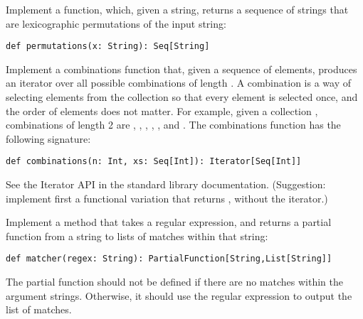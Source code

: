 \documentclass[11pt]{article}
\begin{document}

\begin{myExercise}
Implement a  function, which, given a string, returns a sequence of strings that are lexicographic permutations of the input string:
\begin{lstlisting}
def permutations(x: String): Seq[String]
\end{lstlisting}
\end{myExercise}

\begin{myExercise}
Implement a combinations function that, given a sequence of elements, produces an iterator over all possible combinations of length . A combination is a way of selecting elements from the collection so that every element is selected once, and the order of elements does not matter. For example, given a collection , combinations of length 2 are , , , , , and . The combinations function has the following signature:
\begin{lstlisting}
def combinations(n: Int, xs: Seq[Int]): Iterator[Seq[Int]]
\end{lstlisting}
See the Iterator API in the standard library documentation.
(Suggestion: implement first a functional variation that returns , without the iterator.)
\end{myExercise}

\begin{myExercise}
Implement a method that takes a regular expression, and returns a partial function from a string to lists of matches within that string:
\begin{lstlisting}
def matcher(regex: String): PartialFunction[String,List[String]]
\end{lstlisting}
The partial function should not be defined if there are no matches within the argument strings. Otherwise, it should use the regular expression to output the list of matches.
\end{myExercise}
\end{document}
